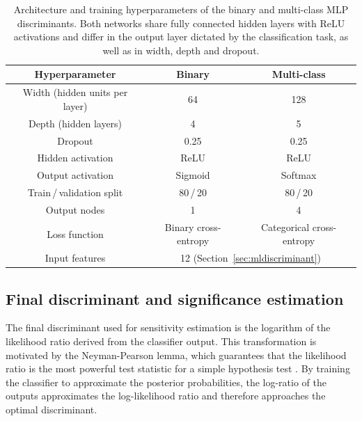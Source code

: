 \begin{table}[htbp]
  \centering
  \caption{Architecture and training hyperparameters of the binary and multi-class MLP discriminants. Both networks share fully connected hidden layers with ReLU activations and differ in the output layer dictated by the classification task, as well as in width, depth and dropout.}
  \label{tab:mlp_hyperparams}
  \begin{tabular}{|c|c|c|}
    \hline
    \textbf{Hyperparameter} & \textbf{Binary} & \textbf{Multi-class} \\
    \hline
    Width (hidden units per layer) & 64 & 128 \\
    Depth (hidden layers)          & 4& 5 \\
    Dropout                        & 0.25& 0.25 \\
    Hidden activation              & ReLU & ReLU \\
    Output activation              & Sigmoid & Softmax \\
    Train\,/\,validation split     & 80\,/\,20 & 80\,/\,20 \\
    Output nodes                   & 1 & 4 \\
    Loss function                  & Binary cross-entropy & Categorical cross-entropy \\
    Input features                 & \multicolumn{2}{c|}{12 (Section~\ref{sec:mldiscriminant})} \\
    \hline
  \end{tabular}
\end{table}

\subsection{Final discriminant and significance estimation}
\label{final_discirminant}
The final discriminant used for sensitivity estimation is the logarithm of the likelihood ratio derived from the classifier output. This transformation is motivated by the Neyman-Pearson lemma, which guarantees that the likelihood ratio is the most powerful test statistic for a simple hypothesis test \cite{Neyman:1933wgr}. By training the classifier to approximate the posterior probabilities, the log-ratio of the outputs approximates the log-likelihood ratio and therefore approaches the optimal discriminant.

